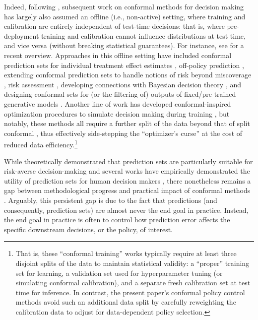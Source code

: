 Indeed, following \citet{vovk2018conformal}, subsequent work on conformal methods for decision making has largely also assumed an offline (i.e., non-active) setting, where training and calibration are entirely independent of test-time decisions: that is, where pre-deployment training and calibration cannot influence distributions at test time, and vice versa (without breaking statistical guarantees). For instance, see \citet{hullman2025conformal} for a recent overview. Approaches in this offline setting have included conformal prediction sets for individual treatment effect estimates \citep{lei2021conformal}, off-policy prediction \citep{taufiq2022conformal, zhang2023conformal}, extending conformal prediction sets to handle notions of risk beyond miscoverage \citep{bates2021distribution, angelopoulos2022conformal}, risk assessment \citep{prinster2022jaws, singh2023distribution, zhou2025conformalized}, developing connections with Bayesian decision theory \citep{hoff2023bayes, snell2025conformal}, and designing conformal sets for (or the filtering of) outputs of fixed/pre-trained generative models \citep{quach2023conformal, teneggi2023trust, mohri2024language, cherian2024large, overman2024aligning, jiang2025conformal}. Another line of work has developed conformal-inspired optimization procedures to simulate decision making during training \citep{colombo2020training, stutz2021learning, cortes2024utility, yeh2024end, yeh2025conformal}, but notably, these methods all require a further split of the data beyond that of split conformal \citep{papadopoulos2002inductive}, thus effectively side-stepping the ``optimizer's curse'' at the cost of reduced data efficiency.\footnote{That is, 
these ``conformal training'' works typically require at least three disjoint splits of the data to maintain statistical validity: a ``proper'' training set for learning, a validation set used for hyperparameter tuning (or simulating conformal calibration), and a separate fresh calibration set at test time for inference.
In contrast, the present paper's conformal policy control methods avoid such an additional data split by carefully reweighting the calibration data to adjust for data-dependent policy selection.} 


While \citet{kiyani2025decision} theoretically demonstrated that prediction sets are particularly suitable for risk-averse decision-making and several works have empirically demonstrated the utility of prediction sets for human decision makers \citep{straitouri2023improving, cresswell2024conformal, zhang2024evaluating}, there nonetheless remains a gap between methodological progress and practical impact of conformal methods \citep{hullman2025conformal}. Arguably, this persistent gap is due to the fact that predictions (and consequently, prediction sets) are almost never the end goal in practice. Instead, the end goal in practice is often to control how prediction error affects the specific downstream decisions, or the policy, of interest.


